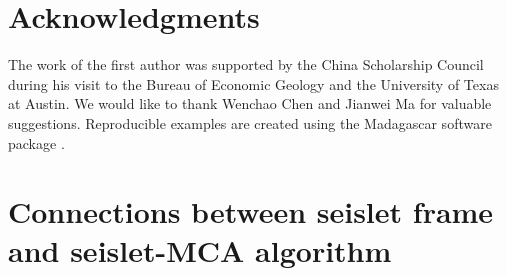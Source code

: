 \section*{Acknowledgments}

The work of the first author was supported by the China Scholarship Council during his visit to the Bureau of Economic Geology and the University of Texas at Austin. We would like to thank Wenchao Chen and Jianwei Ma for valuable suggestions. Reproducible examples are created using the  Madagascar software package \citep{m8r}.

\appendix
\section{Connections between seislet frame and seislet-MCA algorithm}
\label{app:seisletframe}

